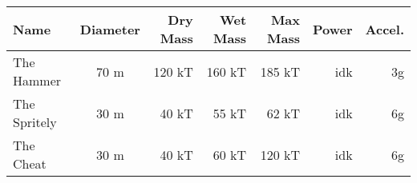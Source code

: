 \begin{tabular}{|l | c | r | r | r | r | r |}
\hline  Name & Diameter & Dry Mass & Wet Mass & Max Mass & Power & Accel.\\\hline
        The Hammer & 70 m &  120 kT &  160 kT &  185 kT &  idk &  3g\\
        The Spritely & 30 m &  40 kT &  55 kT &  62 kT &  idk &  6g\\
        The Cheat & 30 m &  40 kT &  60 kT &  120 kT &  idk &  6g\\
\hline\end{tabular}